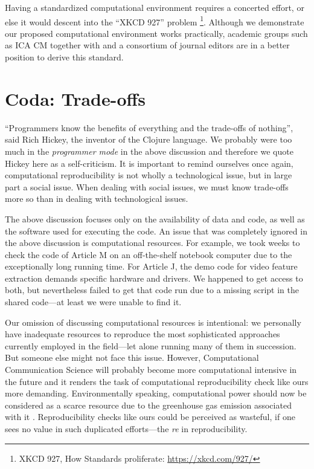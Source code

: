 Having a standardized computational environment requires a concerted effort, or else it would descent into the ``XKCD 927'' problem \footnote{XKCD 927, How Standards proliferate: \url{https://xkcd.com/927/}}. Although we demonstrate our proposed computational environment works practically, academic groups such as ICA CM together with and a consortium of journal editors are in a better position to derive this standard.

\section{Coda: Trade-offs}

``Programmers know the benefits of everything and the trade-offs of nothing'', said Rich Hickey, the inventor of the Clojure language. We probably were too much in the \textit{programmer mode} in the above discussion and therefore we quote Hickey here as a self-criticism. It is important to remind ourselves once again, computational reproducibility is not wholly a technological issue, but in large part a social issue. When dealing with social issues, we must know trade-offs more so than in dealing with technological issues.

The above discussion focuses only on the availability of data and code, as well as the software used for executing the code. An issue that was completely ignored in the above discussion is computational resources. For example, we took weeks to check the code of Article M on an off-the-shelf notebook computer due to the exceptionally long running time. For Article J, the demo code for video feature extraction demands specific hardware and drivers. We happened to get access to both, but nevertheless failed to get that code run due to a missing script in the shared code---at least we were unable to find it. 

Our omission of discussing computational resources is intentional: we personally have inadequate resources to reproduce the most sophisticated approaches currently employed in the field---let alone running many of them in succession. But someone else might not face this issue. However, Computational Communication Science will probably become more computational intensive in the future and it renders the task of computational reproducibility check like ours more demanding. Environmentally speaking, computational power should now be considered as a scarce resource due to the greenhouse gas emission associated with it \parencite[]{Wu:2022}. Reproducibility checks like ours could be perceived as wasteful, if one sees no value in such duplicated efforts---the \textit{re} in reproducibility.

